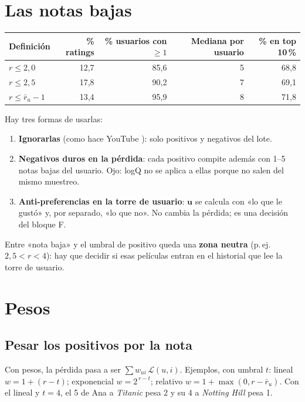 \documentclass[a4paper,11pt]{article}
\begin{document}
\section{Las notas bajas}
\begin{center}
\begin{tabular}{lrrrr}
\toprule
Definición & \% ratings & \% usuarios con $\ge1$ & Mediana por usuario & \% en top 10\,\% \\
\midrule
$r\le2{,}0$ & 12,7 & 85,6 & 5 & 68,8 \\
$r\le2{,}5$ & 17,8 & 90,2 & 7 & 69,1 \\
$r\le\bar r_u-1$ & 13,4 & 95,9 & 8 & 71,8 \\
\bottomrule
\end{tabular}
\end{center}
Hay tres formas de usarlas:
\begin{enumerate}
  \item \textbf{Ignorarlas} (como hace YouTube \cite{covington2016}): solo positivos y negativos del lote.
  \item \textbf{Negativos duros en la pérdida}: cada positivo compite además con 1--5 notas bajas del usuario. Ojo: logQ
        no se aplica a ellas porque no salen del mismo muestreo.
  \item \textbf{Anti-preferencias en la torre de usuario}: $\mathbf{u}$ se calcula con «lo que le gustó» y, por separado,
        «lo que no». No cambia la pérdida; es una decisión del bloque F.
\end{enumerate}
Entre «nota baja» y el umbral de positivo queda una \textbf{zona neutra} (p.\,ej. $2{,}5<r<4$): hay que decidir si esas
películas entran en el historial que lee la torre de usuario.

\section{Pesos}

\subsection{Pesar los positivos por la nota}
Con pesos, la pérdida pasa a ser $\sum w_{ui}\,\mathcal{L}(u,i)$. Ejemplos, con umbral $t$:
lineal $w=1+(r-t)$; exponencial $w=2^{\,r-t}$; relativo $w=1+\max(0,r-\bar r_u)$. Con el lineal y $t=4$,
el 5 de Ana a \emph{Titanic} pesa 2 y su 4 a \emph{Notting Hill} pesa 1.
\end{document}
